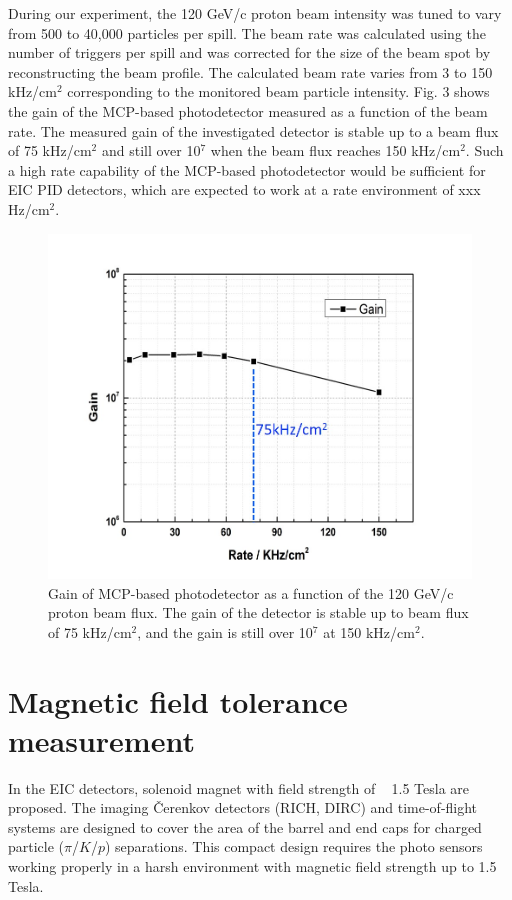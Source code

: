 \documentclass[preprint,5p]{elsarticle}
\begin{document}
During our experiment, the 120 GeV/c proton beam intensity was tuned to vary from 500 to 40,000 particles per spill. The beam rate was calculated using the number of triggers per spill and was corrected for the size of the beam spot by reconstructing the beam profile. The calculated beam rate varies from 3 to 150 kHz/cm$^2$ corresponding to the monitored beam particle intensity. Fig. 3 shows the gain of the MCP-based photodetector measured as a function of the beam rate. The measured gain of the investigated detector is stable up to a beam flux of 75 kHz/cm$^2$ and still over 10$^7$ when the beam flux reaches 150 kHz/cm$^2$. Such a high rate capability of the MCP-based photodetector would be sufficient for EIC PID detectors, which are expected to work at a rate environment of  xxx Hz/cm$^2$.

\begin{figure}[tbp]
\centering 
\includegraphics[scale=0.25]{fig/MCPs_gain_proton_beam.png}
\caption{Gain of MCP-based photodetector as a function of the 120 GeV/c proton beam flux. The gain of the detector is stable up to beam flux of 75 kHz/cm$^2$, and the gain is still over 10$^7$ at 150 kHz/cm$^2$. } 
\label{fig:MCPs_gain_proton_beam}
\end{figure}

\section{Magnetic field tolerance measurement}\label{sec_B_measurement}
In the EIC detectors, solenoid magnet with field strength of ~ 1.5 Tesla are proposed. The imaging Čerenkov detectors (RICH, DIRC) and time-of-flight systems are designed to cover the area of the barrel and end caps for charged particle ($\pi$/$K$/$p$) separations. This compact design requires the photo sensors working properly in a harsh environment with magnetic field strength up to 1.5 Tesla. 
\end{document}
